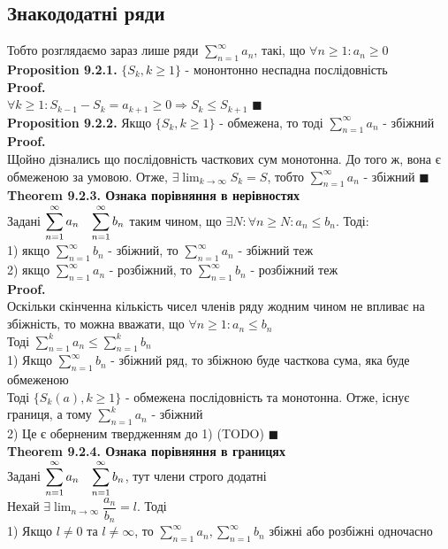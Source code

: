 \documentclass[a4paper, 14pt]{extarticle}
\def\huge{\displaystyle}
\def\bigline{\vspace{5mm}\\}
\def\prp#1{\textbf{Proposition {#1}}}
\def\th#1{\textbf{Theorem {#1}}}
\def\proof{\textbf{Proof.}\\}
\def\bigline{\vspace{5mm}\\}
\def\qed{$\blacksquare$}
\begin{document}
\subsection{Знакододатні ряди}
Тобто розглядаємо зараз лише ряди $\huge \sum_{n=1}^{\infty} a_n$, такі, що $\forall n \geq 1: a_n \geq 0$\\
\prp{9.2.1.} $\{S_k, k \geq 1\}$ - мононтонно неспадна послідовність\\
\proof
$\forall k \geq 1: S_{k-1} - S_k = a_{k+1} \geq 0 \Rightarrow S_{k} \leq S_{k+1}$ \qed
\bigline
\prp{9.2.2.} Якщо $\{S_k, k \geq 1\}$ - обмежена, то тоді $\huge \sum_{n=1}^{\infty} a_n$ - збіжний\\
\proof
Щойно дізнались що послідовність часткових сум монотонна. До того ж, вона є обмеженою за умовою. Отже, $\exists \huge \lim_{k \to \infty} S_k = S$, тобто  $\huge \sum_{n=1}^{\infty} a_n$ - збіжний \qed
\bigline
\th{9.2.3. Ознака порівняння в нерівностях}\\
Задані $\huge \sum_{n=1}^{\infty} a_n \hspace{0.3cm} \sum_{n=1}^{\infty} b_n$ таким чином, що $\exists N: \forall n \geq N: a_n \leq b_n$. Тоді:\\
1) якщо $\huge \sum_{n=1}^{\infty} b_n$ - збіжний, то $\huge \sum_{n=1}^{\infty} a_n$ - збіжний теж\\
2) якщо $\huge \sum_{n=1}^{\infty} a_n$ - розбіжний, то $\huge \sum_{n=1}^{\infty} b_n$ - розбіжний теж\\
\proof
Оскільки скінченна кількість чисел членів ряду жодним чином не впливає на збіжність, то можна вважати, що $\forall n \geq 1: a_n \leq b_n$\\
Тоді $\huge \sum_{n=1}^k a_n \leq \sum_{n=1}^k b_n$\\
1) Якщо $\huge \sum_{n=1}^\infty b_n$ - збіжний ряд, то збіжною буде часткова сума, яка буде обмеженою\\
Тоді $\{S_k(a), k \geq 1\}$ - обмежена послідовність та монотонна. Отже, існує границя, а тому $\huge \sum_{n=1}^k a_n$ - збіжний\\
2) Це є оберненим твердженням до 1) (TODO) \qed
\bigline
\th{9.2.4. Ознака порівняння в границях}\\
Задані $\huge \sum_{n=1}^{\infty} a_n \hspace{0.3cm} \sum_{n=1}^{\infty} b_n$, тут члени строго додатні\\
Нехай $\exists \huge \lim_{n \to \infty} \dfrac{a_n}{b_n} = l$. Тоді\\
1) Якщо $l \neq 0$ та $l \neq \infty$, то $\huge \sum_{n=1}^{\infty} a_n, \sum_{n=1}^{\infty} b_n$ збіжні або розбіжні одночасно\\
\end{document}
